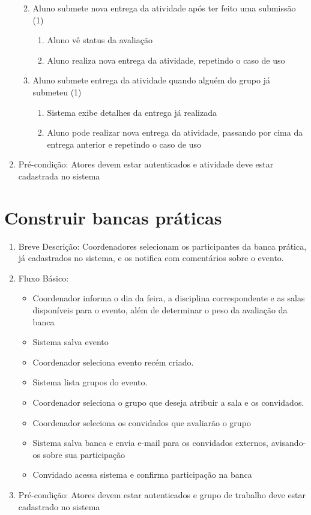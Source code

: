 \begin{enumerate}
\begin{enumerate}
\begin{enumerate}
        \end{enumerate}
        \item Aluno submete nova entrega da atividade após ter feito uma submissão (1)
        \begin{enumerate}
            \item Aluno vê status da avaliação
            \item Aluno realiza nova entrega da atividade, repetindo o caso de uso
        \end{enumerate}
        \item Aluno submete entrega da atividade quando alguém do grupo já submeteu (1)
        \begin{enumerate}
            \item Sistema exibe detalhes da entrega já realizada
            \item Aluno pode realizar nova entrega da atividade, passando por cima da entrega anterior e repetindo o caso de uso
        \end{enumerate}
    \end{enumerate}
    \item Pré-condição: Atores devem estar autenticados e atividade deve estar cadastrada no sistema
\end{enumerate}


\section{Construir bancas práticas}
\begin{enumerate}
    \item Breve Descrição: Coordenadores selecionam os participantes da banca prática, já cadastrados no sistema, e os notifica com comentários sobre o evento.
    \item Fluxo Básico:
    \begin{itemize}
        \item Coordenador informa o dia da feira, a disciplina correspondente e as salas disponíveis para o evento, além de determinar o peso da avaliação da banca
        \item Sistema salva evento
        \item Coordenador seleciona evento recém criado.
        \item Sistema lista grupos do evento.
        \item Coordenador seleciona o grupo que deseja atribuir a sala e os convidados.
        \item Coordenador seleciona os convidados que avaliarão o grupo
        \item Sistema salva banca e envia e-mail para os convidados externos, avisando-os sobre sua participação
        \item Convidado acessa sistema e confirma participação na banca
    \end{itemize}
    \item Pré-condição: Atores devem estar autenticados e grupo de trabalho deve estar cadastrado no sistema
\end{enumerate}

